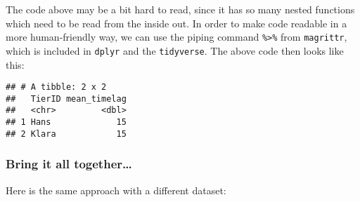 \documentclass[
]{article}
\newenvironment{Shaded}{\begin{snugshade}}{\end{snugshade}}
\newcommand{\CommentTok}[1]{\textcolor[rgb]{0.56,0.35,0.01}{\textit{#1}}}
\newcommand{\DataTypeTok}[1]{\textcolor[rgb]{0.13,0.29,0.53}{#1}}
\newcommand{\KeywordTok}[1]{\textcolor[rgb]{0.13,0.29,0.53}{\textbf{#1}}}
\newcommand{\NormalTok}[1]{#1}
\newcommand{\OperatorTok}[1]{\textcolor[rgb]{0.81,0.36,0.00}{\textbf{#1}}}
\newcommand{\StringTok}[1]{\textcolor[rgb]{0.31,0.60,0.02}{#1}}
\begin{document}
The code above may be a bit hard to read, since it has so many nested
functions which need to be read from the inside out. In order to make
code readable in a more human-friendly way, we can use the piping
command \texttt{\%\textgreater{}\%} from \texttt{magrittr}, which is
included in \texttt{dplyr} and the \texttt{tidyverse}. The above code
then looks like this:

\begin{Shaded}
\end{Shaded}

\begin{verbatim}
## # A tibble: 2 x 2
##   TierID mean_timelag
##   <chr>         <dbl>
## 1 Hans             15
## 2 Klara            15
\end{verbatim}

\hypertarget{bring-it-all-together}{%
\subsubsection{Bring it all
together\ldots{}}\label{bring-it-all-together}}

Here is the same approach with a different dataset:
\end{document}
